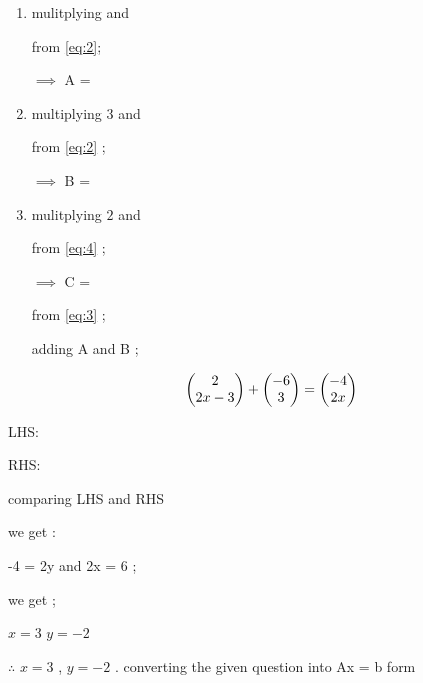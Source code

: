 \documentclass[journal,12pt,twocolumn]{IEEEtran}
\begin{document}
       \begin{enumerate} [label=(\roman*)]
 \item mulitplying 
        and 
      
       from \eqref{eq:2};
      
       $\implies$  A = \  
      
 \item multiplying $3$ and
      
       from \eqref{eq:2} ;
      
       $\implies$  B =  
       
 \item mulitplying 
       $2$ and  

       from \eqref{eq:4} ;
      
       $\implies$  C = 
      
       from \eqref{eq:3} ; 
      
       adding A and B ;
       
       \begin{align}
       \begin{pmatrix}2\\2x-3 \end{pmatrix} + \begin{pmatrix}-6\\3\end{pmatrix} = 
       \begin{pmatrix}-4\\2x\end{pmatrix} 
       \end{align}
       \end{enumerate} 
      \newpage
{LHS}: 
      
{RHS}:              
      
       comparing {LHS} and {RHS}
      
       we get :
      
       -4 = 2y and 2x = 6 ;
      
       we get ;
      
      $x = 3$ $y = -2$ 
      
     $\therefore$ $x = 3$  , $y = -2$ .
      \newpage
      converting the given question into Ax = b form 
   
\end{document}
